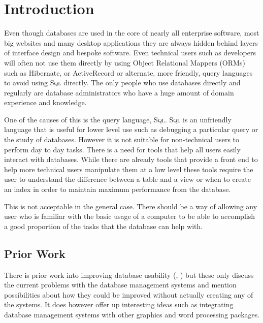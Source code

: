\chapter{Introduction}

Even though databases are used in the core of nearly all enterprise software, most big websites and many desktop applications they are always hidden behind layers of interface design and bespoke software. Even technical users such as developers will often not use them directly by using Object Relational Mappers (ORMs) such as Hibernate, or ActiveRecord or alternate, more friendly, query languages to avoid using \textsc{Sql} directly. The only people who use databases directly and regularly are database administrators who have a huge amount of domain experience and knowledge.

One of the causes of this is the query language, \textsc{Sql}. \textsc{Sql} is an unfriendly language that is useful for lower level use such as debugging a particular query or the study of databases. However it is not suitable for non-technical users to perform day to day tasks. There is a need for tools that help all users easily interact with databases. While there are already tools that provide a front end to help more technical users manipulate them at a low level these tools require the user to understand the difference between a table and a view or when to create an index in order to maintain maximum performance from the database.

This is not acceptable in the general case. There should be a way of allowing any user who is familiar with the basic usage of a computer to be able to accomplish a good proportion of the tasks that the database can help with.

\section{Prior Work}

There is prior work into improving database usability (\cite{database-use}, \cite{Jagadish2007}) but these only discuss the current problems with the database management systems and mention possibilities about how they could be improved without actually creating any of the systems. It does however offer up interesting ideas such as integrating database management systems with other graphics and word processing packages.